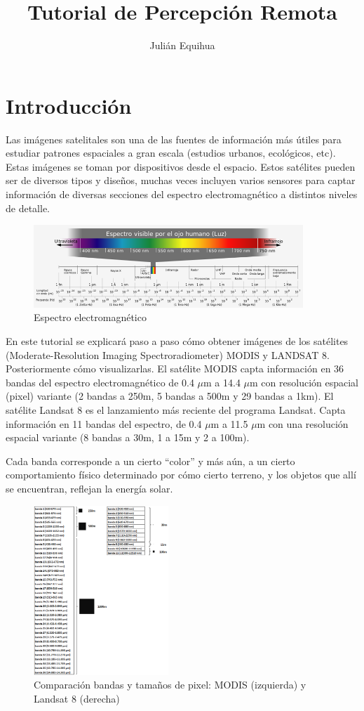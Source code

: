 \documentclass[11pt,spanish]{article}
\title{Tutorial de Percepción Remota}
\author{Julián Equihua}
\begin{document}
\section{Introducción}

Las imágenes satelitales son una de las fuentes de información más útiles para estudiar patrones espaciales a gran escala (estudios urbanos, ecológicos, etc). Estas imágenes se toman por dispositivos desde el espacio. Estos satélites pueden ser de diversos tipos y diseños, muchas veces incluyen varios sensores para captar información de diversas secciones del espectro electromagnético a distintos niveles de detalle.


\begin{figure}[h!]
	\centering
		\includegraphics[width=4in]{../Figuras_y_logos/1_espectro.png}
	\caption{Espectro electromagnético}
	\label{fig:1_espectro}
\end{figure}
 
En este tutorial se explicará paso a paso cómo obtener imágenes de los satélites (Moderate-Resolution Imaging Spectroradiometer) MODIS y LANDSAT 8. Posteriormente cómo visualizarlas. El satélite MODIS capta información en 36 bandas del espectro electromagnético de 0.4 $\mu$m a 14.4 $\mu$m con resolución espacial (pixel) variante (2 bandas a 250m, 5 bandas a 500m y 29 bandas a 1km). El satélite Landsat 8 es el lanzamiento más reciente del programa Landsat. Capta información en 11 bandas del espectro, de 0.4 $\mu$m a 11.5 $\mu$m con una resolución espacial variante (8 bandas a 30m, 1 a 15m y 2 a 100m).

Cada banda corresponde a un cierto ``color'' y más aún, a un cierto comportamiento físico determinado por cómo cierto terreno, y los objetos que allí se encuentran, reflejan la energía solar.

\begin{figure}[h!]
	\centering
		\includegraphics[width=2in]{../Figuras_y_logos/2_bandas_modis_landsat.png}
	\caption{Comparación bandas y tamaños de pixel: MODIS (izquierda) y Landsat 8 (derecha)}
	\label{fig:2_bandas_modis_landsat}
\end{figure}
\end{document}
